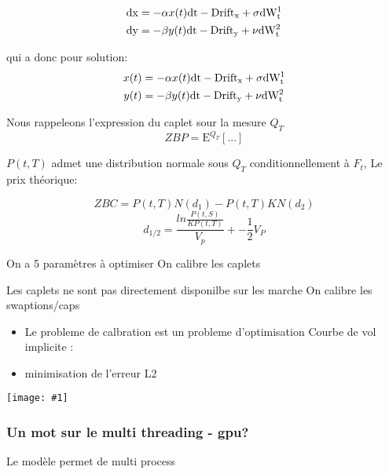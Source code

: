\documentclass[paper=a4, fontsize=11pt]{scrartcl}
\numberwithin{equation}{section}		%
\numberwithin{figure}{section}			%
\numberwithin{table}{section}				%
\newcommand{\Qespr}[2]{
  \mathrm{E}^{#1} \left[ #2 \right]
}
\theoremstyle{definition}
\newcommand{\IMG}[3]{
  \begin{center}
    \texttt{[image: \#1]}%
    \end{center}
}
\begin{document}
\begin{align*}
  \rm{d}x &= -\alpha x(t) \rm{d}t - Drift_x + \sigma \rm{d}W^1_t \\
  \rm{d}y &= -\beta y(t) \rm{d}t - Drift_y + \nu \rm{d}W^2_t \\
\end{align*}

qui a donc pour solution:
\begin{align*}
  x(t) &= -\alpha x(t) \rm{d}t - Drift_x + \sigma \rm{d}W^1_t \\
  y(t) &= -\beta y(t) \rm{d}t - Drift_y + \nu \rm{d}W^2_t \\
\end{align*}

Nous rappeleons l'expression du caplet sour la mesure $Q_T$
$$ZBP = \Qespr{Q_T}{ ... } $$

$P(t, T)$ admet une distribution normale sous $Q_T$ conditionnellement à $F_t$, 
Le prix théorique:

$$ZBC = P(t, T) N( d_1 ) - P(t, T) K N(d_2)$$
$$d_{1/2} = \frac{ln \frac{P(t, S)}{KP(t, T)}}{V_p} +- \frac{1}{2} V_P $$

On a 5 paramètres à optimiser
On calibre les caplets

Les caplets ne sont pas directement disponilbe sur les marche
On calibre les swaptions/caps

\begin{itemize}
\item Le probleme de calbration est un probleme d'optimisation Courbe
  de vol implicite :
\item minimisation de l'erreur L2
\end{itemize}
\IMG{img/capsurf.png}{Cap surface}{0.5}

\subsubsection{Un mot sur le multi threading - gpu?}
Le modèle permet de 
multi process

%
\end{document}

